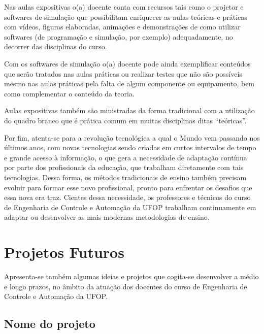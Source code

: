 Nas aulas expositivas o(a) docente conta com recursos tais como o projetor e softwares de simulação que possibilitam enriquecer as aulas teóricas e práticas com vídeos, figuras elaboradas, animações e demonstrações de como utilizar softwares (de programação e simulação, por exemplo) adequadamente, no decorrer das disciplinas do curso. 

Com os softwares de simulação o(a) docente pode ainda exemplificar conteúdos que serão tratados nas aulas práticas ou realizar testes que não são possíveis mesmo nas aulas práticas pela falta de algum componente ou equipamento, bem como complementar o conteúdo da teoria.

Aulas expositivas também são ministradas da forma tradicional com a utilização do quadro branco que é prática comum em muitas disciplinas ditas ``teóricas''.

Por fim, atenta-se para a revolução tecnológica a qual o Mundo vem passando nos últimos anos, com novas tecnologias sendo criadas em curtos intervalos de tempo e grande acesso à informação, o que gera a necessidade de adaptação contínua por parte dos profissionais da educação, que trabalham diretamente com tais tecnologias. Dessa forma, os métodos tradicionais de ensino também precisam evoluir para formar esse novo profissional, pronto para enfrentar os desafios que essa nova era traz. Cientes dessa necessidade, os professores e técnicos do curso de Engenharia de Controle e Automação da UFOP trabalham continuamente em adaptar ou desenvolver as mais modernas metodologias de ensino. 

\section{Projetos Futuros}
Apresenta-se também algumas ideias e projetos que cogita-se desenvolver a médio e longo prazos, no âmbito da atuação dos docentes do curso de Engenharia de Controle e Automação da UFOP.

\subsection*{Nome do projeto}


